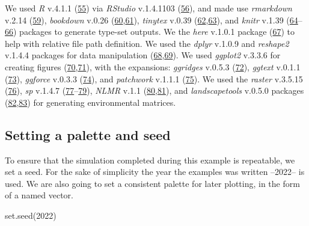 \documentclass[10pt,a4paper]{article}
\newenvironment{Shaded}{}{}
\newcommand{\DecValTok}[1]{#1}
\newcommand{\FunctionTok}[1]{#1}
\newcommand{\NormalTok}[1]{#1}
\begin{document}
We used \emph{R} v.4.1.1 (\protect\hyperlink{ref-R-base}{55}) via \emph{RStudio} v.1.4.1103 (\protect\hyperlink{ref-RStudioTeam2021}{56}), and made use \emph{rmarkdown} v.2.14 (\protect\hyperlink{ref-rmarkdown2020}{59}), \emph{bookdown} v.0.26 (\protect\hyperlink{ref-bookdown2016}{60},\protect\hyperlink{ref-R-bookdown}{61}), \emph{tinytex} v.0.39 (\protect\hyperlink{ref-tinytex2019}{62},\protect\hyperlink{ref-R-tinytex}{63}), and \emph{knitr} v.1.39 (\protect\hyperlink{ref-knitr2015}{64}--\protect\hyperlink{ref-R-knitr}{66}) packages to generate type-set outputs.
We the \emph{here} v.1.0.1 package (\protect\hyperlink{ref-R-here}{67}) to help with relative file path definition.
We used the \emph{dplyr} v.1.0.9 and \emph{reshape2} v.1.4.4 packages for data manipulation (\protect\hyperlink{ref-R-dplyr}{68},\protect\hyperlink{ref-reshape22007}{69}).
We used \emph{ggplot2} v.3.3.6 for creating figures (\protect\hyperlink{ref-R-ggplot2}{70},\protect\hyperlink{ref-ggplot22016}{71}), with the expansions: \emph{ggridges} v.0.5.3 (\protect\hyperlink{ref-R-ggridges}{72}), \emph{ggtext} v.0.1.1 (\protect\hyperlink{ref-R-ggtext}{73}), \emph{ggforce} v.0.3.3 (\protect\hyperlink{ref-R-ggforce}{74}), and \emph{patchwork} v.1.1.1 (\protect\hyperlink{ref-R-patchwork}{75}).
We used the \emph{raster} v.3.5.15 (\protect\hyperlink{ref-R-raster}{76}), \emph{sp} v.1.4.7 (\protect\hyperlink{ref-sp2013}{77}--\protect\hyperlink{ref-R-sp}{79}), \emph{NLMR} v.1.1 (\protect\hyperlink{ref-NLMR2018}{80},\protect\hyperlink{ref-R-NLMR}{81}), and \emph{landscapetools} v.0.5.0 packages (\protect\hyperlink{ref-landscapetools2018}{82},\protect\hyperlink{ref-R-landscapetools}{83}) for generating environmental matrices.

\hypertarget{setting-a-palette-and-seed}{%
\subsection{Setting a palette and seed}\label{setting-a-palette-and-seed}}

To ensure that the simulation completed during this example is repeatable, we set a seed.
For the sake of simplicity the year the examples was written --2022-- is used.
We are also going to set a consistent palette for later plotting, in the form of a named vector.

\begin{Shaded}
\begin{Highlighting}[]
\FunctionTok{set.seed}\NormalTok{(}\DecValTok{2022}\NormalTok{)}
\end{Highlighting}
\end{Shaded}
\end{document}
